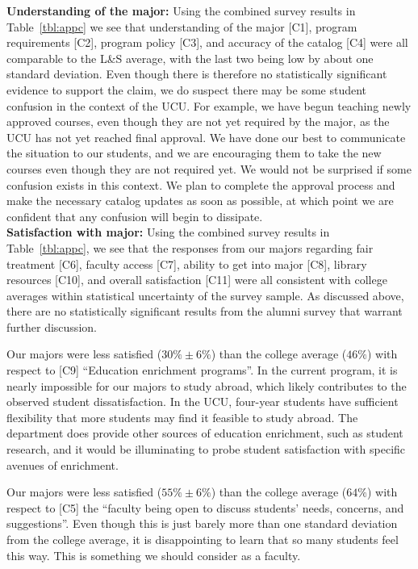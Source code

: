 \documentclass[12pt]{article}
\begin{document}
\noindent
{\bf Understanding of the major:} Using the combined survey results in
Table~\ref{tbl:appc} we see that understanding of the major [C1],
program requirements [C2], program policy [C3], and accuracy of the
catalog [C4] were all comparable to the L\&S average, with the last
two being low by about one standard deviation.  Even though there is
therefore no statistically significant evidence to support the claim,
we do suspect there may be some student confusion in the context of
the UCU.  For example, we have begun teaching newly approved courses,
even though they are not yet required by the major, as the UCU has not
yet reached final approval.  We have done our best to communicate the
situation to our students, and we are encouraging them to take the new
courses even though they are not required yet.  We would not be
surprised if some confusion exists in this context.  We plan to
complete the approval process and make the necessary catalog updates
as soon as possible, at which point we are confident that any
confusion will begin to dissipate.\\[3pt]

\noindent
{\bf Satisfaction with major:} Using the combined survey results in
Table~\ref{tbl:appc}, we see that the responses from our majors
regarding fair treatment [C6], faculty access [C7], ability to get
into major [C8], library resources [C10], and overall satisfaction
[C11] were all consistent with college averages within statistical
uncertainty of the survey sample.  As discussed above, there are no
statistically significant results from the alumni survey that warrant
further discussion.

Our majors were less satisfied ($30\% \pm 6\%$) than the college
average ($46\%$) with respect to [C9] ``Education enrichment
programs''.  In the current program, it is nearly impossible for our
majors to study abroad, which likely contributes to the observed
student dissatisfaction.  In the UCU, four-year students have
sufficient flexibility that more students may find it feasible to
study abroad.  The department does provide other sources of education
enrichment, such as student research, and it would be illuminating to
probe student satisfaction with specific avenues of enrichment.

Our majors were less satisfied ($55\%\pm6\%$) than the college average
($64\%$) with respect to [C5] the ``faculty being open to discuss
students' needs, concerns, and suggestions''.  Even though this is
just barely more than one standard deviation from the college average,
it is disappointing to learn that so many students feel this way.
This is something we should consider as a faculty.\\[3pt]
\end{document}
